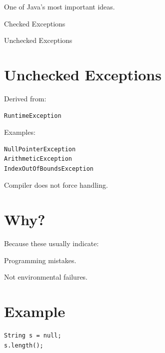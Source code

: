 \documentclass[11pt,a4paper]{book}
\begin{document}
One of Java's most important ideas.


Checked Exceptions


Unchecked Exceptions


\section{Unchecked Exceptions}

Derived from:

\begin{verbatim} 
RuntimeException
\end{verbatim}


Examples:

\begin{verbatim} 
NullPointerException
ArithmeticException
IndexOutOfBoundsException
\end{verbatim}


Compiler does not force handling.


\section{Why?}

Because these usually indicate:


Programming mistakes.


Not environmental failures.

\section{Example}

\begin{verbatim} 
String s = null;
s.length();
\end{verbatim}
\end{document}
